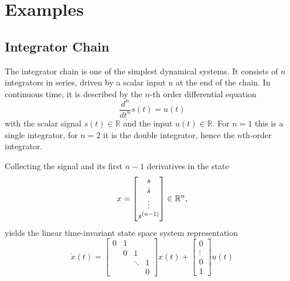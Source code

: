 \section{Examples}

\subsection{Integrator Chain}
\label{sec:integrator_chain}

The integrator chain is one of the simplest dynamical systems.
It consists of $n$ integrators in series, driven by a scalar input $u$ at the end of the chain.
In continuous time, it is described by the $n$-th order differential equation
\[
\frac{d^n}{dt^n} s(t) = u(t)
\]
with the scalar signal $s(t) \in \mathbb{R}$ and the input $u(t) \in \mathbb{R}$.
For $n = 1$ this is a single integrator, for $n = 2$ it is the double integrator, hence the $n$th-order integrator.

Collecting the signal and its first $n-1$ derivatives in the state
\[
x = \begin{bmatrix} s \\ \dot{s} \\ \vdots \\ s^{(n-1)} \end{bmatrix} \in \mathbb{R}^{n},
\]
yields the linear time-invariant state space system representation
\[
\dot{x}(t) = 
\begin{bmatrix}
    0 & 1 &        &  \\
      & 0 & 1      &  \\
      &   & \ddots & 1 \\
      &   &        & 0
\end{bmatrix} x(t) + 
\begin{bmatrix} 0 \\ \vdots \\ 0 \\ 1 \end{bmatrix} u(t)
\]

